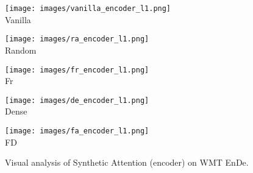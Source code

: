 \documentclass{article}
\begin{document}
\begin{figure}[H]
\begin{minipage}{0.18\linewidth}
  \centering
     \texttt{[image: images/vanilla\_encoder\_l1.png]}
    \\ {Vanilla}
    \label{fig:sortiter}
\end{minipage}\hfill
\begin{minipage}{0.18\linewidth}
  \centering
     \texttt{[image: images/ra\_encoder\_l1.png]}
    \\ {Random}
    \label{fig:sortiter}
\end{minipage}\hfill
\begin{minipage}{0.18\linewidth}
  \centering
    \texttt{[image: images/fr\_encoder\_l1.png]}
    \\ {Fr}
    \label{fig:temperature}
\end{minipage}\hfill
\begin{minipage}{0.18\linewidth}
  \centering
     \texttt{[image: images/de\_encoder\_l1.png]}
    \\ {Dense}
    \label{fig:sortiter}
\end{minipage}
\begin{minipage}{0.18\linewidth}
  \centering
     \texttt{[image: images/fa\_encoder\_l1.png]}
    \\ {FD}
    \label{fig:sortiter}
\end{minipage}\hfill 
\label{fig:analysis}
\caption{Visual analysis of Synthetic Attention (encoder) on WMT EnDe.}
\end{figure}
\end{document}

